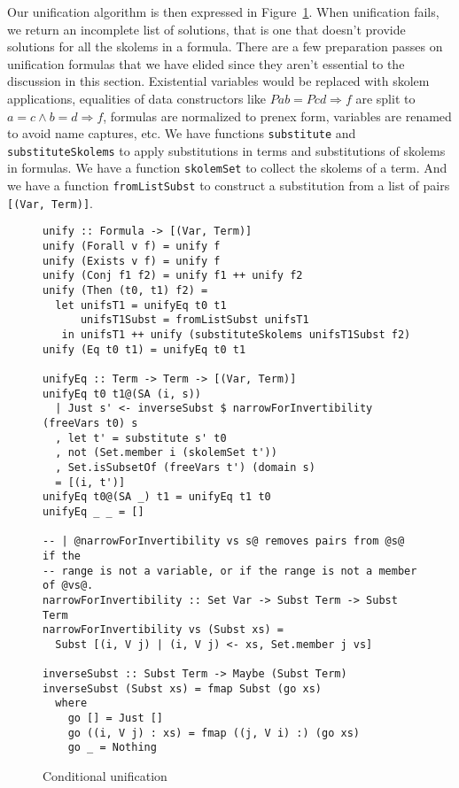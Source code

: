 \documentclass[sigconf, anonymous, review]{acmart}
\newcommand{\tc}[1]{{\small\texttt{#1}}}
\begin{document}
Our unification algorithm is then expressed in Figure~\ref{conditional-unification}.
When unification fails, we return an incomplete list of solutions, that is one that
doesn't provide solutions for all the skolems in a formula.
There are a few preparation passes on unification formulas that we have elided since
they aren't essential to the discussion in this section.
Existential variables would be replaced with skolem applications, equalities of
data constructors like $P a b = P c d \Rightarrow f$ are split to
$a = c \land b = d \Rightarrow f$, formulas are normalized to prenex form, variables
are renamed to avoid name captures, etc. We have functions \tc{substitute} and
\tc{substituteSkolems} to apply substitutions in terms and substitutions of skolems
in formulas. We have a function \tc{skolemSet} to collect the skolems of a
term. And we have a function \tc{fromListSubst} to construct a substitution from
a list of pairs \tc{[(Var, Term)]}.

\begin{figure}
\begin{verbatim}
unify :: Formula -> [(Var, Term)]
unify (Forall v f) = unify f
unify (Exists v f) = unify f
unify (Conj f1 f2) = unify f1 ++ unify f2
unify (Then (t0, t1) f2) =
  let unifsT1 = unifyEq t0 t1
      unifsT1Subst = fromListSubst unifsT1
   in unifsT1 ++ unify (substituteSkolems unifsT1Subst f2)
unify (Eq t0 t1) = unifyEq t0 t1

unifyEq :: Term -> Term -> [(Var, Term)]
unifyEq t0 t1@(SA (i, s))
  | Just s' <- inverseSubst $ narrowForInvertibility (freeVars t0) s
  , let t' = substitute s' t0
  , not (Set.member i (skolemSet t'))
  , Set.isSubsetOf (freeVars t') (domain s)
  = [(i, t')]
unifyEq t0@(SA _) t1 = unifyEq t1 t0
unifyEq _ _ = []

-- | @narrowForInvertibility vs s@ removes pairs from @s@ if the
-- range is not a variable, or if the range is not a member of @vs@.
narrowForInvertibility :: Set Var -> Subst Term -> Subst Term
narrowForInvertibility vs (Subst xs) =
  Subst [(i, V j) | (i, V j) <- xs, Set.member j vs]

inverseSubst :: Subst Term -> Maybe (Subst Term)
inverseSubst (Subst xs) = fmap Subst (go xs)
  where
    go [] = Just []
    go ((i, V j) : xs) = fmap ((j, V i) :) (go xs)
    go _ = Nothing
\end{verbatim}
\caption{Conditional unification}
\label{conditional-unification}
\end{figure}
\end{document}
